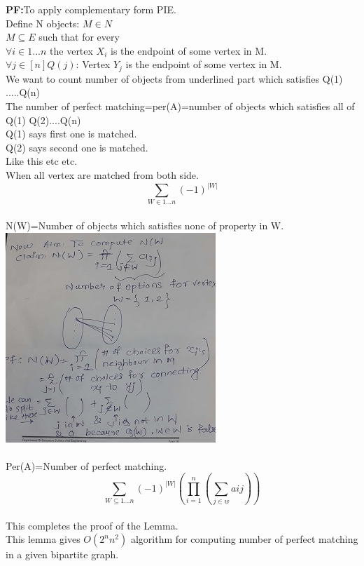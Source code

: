 \textbf{PF:}To apply complementary form PIE.\\
Define N objects: $M \in N$\\
$M \subseteq E$ such that for  every \\
$\forall i \in {1...n}$ the vertex $X_i$ is the endpoint of some vertex in M.\\
$\forall j \in [n] Q(j)$: Vertex $Y_j$ is the endpoint of some vertex in M.\\
We want to count number of objects from underlined part which satisfies Q(1) .....Q(n)\\
The number of perfect matching=per(A)=number of objects which satisfies all of Q(1) Q(2)....Q(n)\\
Q(1) says first one is matched.\\
Q(2) says second one is matched.\\
Like this etc etc.\\
When all vertex are matched from both side.\\
$$ \sum_{W \in {1...n}}(-1)^{|W|}$$\\
N(W)=Number of objects which satisfies none of property in W.\\
\includegraphics{images/img.jpg}\\ \\
Per(A)=Number of perfect matching.\\
$$ \sum_{W \subseteq {1...n}}(-1)^{|W|}(\prod_{i=1}^{n}(\sum_{j \in w}aij)) $$\\
This completes the proof of the Lemma.\\
This lemma gives $O(2^{n}n^{2})$ algorithm for computing number of perfect matching in a given bipartite graph.\\

